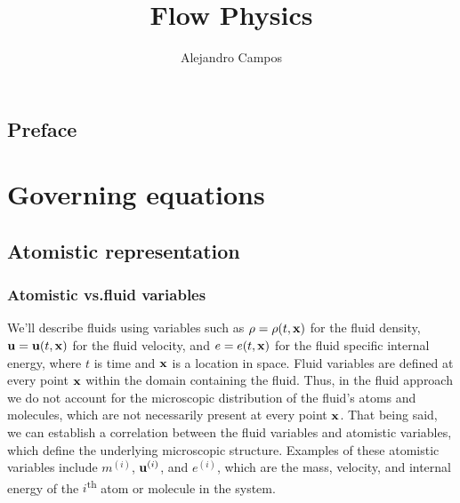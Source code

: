 \documentclass[oneside,a4paper,11pt]{report}
\title{Flow Physics}
\author{Alejandro Campos}
\begin{document}
\maketitle
\tableofcontents

\chapter*{Preface}

\part{Governing equations}

\chapter{Atomistic representation}

\section{Atomistic vs.\@ fluid variables}
\label{sec:atomistic_and_fluid}
We'll describe fluids using variables such as $\rho=\rho(t,\mathbf{x})$ for the fluid density, $\mathbf{u} = \mathbf{u}(t,\mathbf{x})$ for the fluid velocity, and $e=e(t,\mathbf{x})$ for the fluid specific internal energy, where $t$ is time and $\mathbf{x}$ is a location in space. Fluid variables are defined at every point $\mathbf{x}$ within the domain containing the fluid. Thus, in the fluid approach we do not account for the microscopic distribution of the fluid's atoms and molecules, which are not necessarily present at every point $\mathbf{x}$. That being said, we can establish a correlation between the fluid variables and atomistic variables, which define the underlying microscopic structure. Examples of these atomistic variables include $m^{(i)}$, $\mathbf{u}^{(i)}$, and $e^{(i)}$, which are the mass, velocity, and internal energy of the $i$\textsuperscript{th} atom or molecule in the system.
\end{document}
